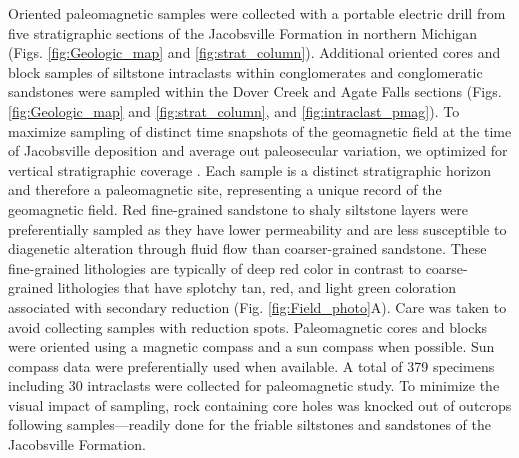 Oriented paleomagnetic samples were collected with a portable electric drill from five stratigraphic sections of the Jacobsville Formation in northern Michigan (Figs. \ref{fig:Geologic_map} and \ref{fig:strat_column}). Additional oriented cores and block samples of siltstone intraclasts within conglomerates and conglomeratic sandstones were sampled within the Dover Creek and Agate Falls sections (Figs. \ref{fig:Geologic_map} and \ref{fig:strat_column}, and \ref{fig:intraclast_pmag}). To maximize sampling of distinct time snapshots of the geomagnetic field at the time of Jacobsville deposition and average out paleosecular variation, we optimized for vertical stratigraphic coverage \cite{Sapienza2023a}. Each sample is a distinct stratigraphic horizon and therefore a paleomagnetic site, representing a unique record of the geomagnetic field. Red fine-grained sandstone to shaly siltstone layers were preferentially sampled as they have lower permeability and are less susceptible to diagenetic alteration through fluid flow than coarser-grained sandstone. These fine-grained lithologies are typically of deep red color in contrast to coarse-grained lithologies that have splotchy tan, red, and light green coloration associated with secondary reduction (Fig. \ref{fig:Field_photo}A). Care was taken to avoid collecting samples with reduction spots. Paleomagnetic cores and blocks were oriented using a magnetic compass and a sun compass when possible. Sun compass data were preferentially used when available. A total of 379 specimens including 30 intraclasts were collected for paleomagnetic study. To minimize the visual impact of sampling, rock containing core holes was knocked out of outcrops following samples---readily done for the friable siltstones and sandstones of the Jacobsville Formation.

